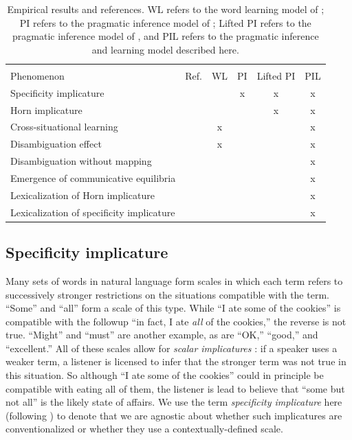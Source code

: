 \documentclass{article} %
\begin{document}
\begin{table}[t]
\label{tab:results}
\begin{center}
\begin{tabular}{lccccc}
\hline \\
Phenomenon & Ref. & WL & PI & Lifted PI  & PIL \\
\hline
Specificity implicature & \cite{grice1975} &  & x &x & x\\
Horn implicature & \cite{horn1984} & &  & x& x\\
Cross-situational learning & \cite{smith2008} & x& & & x \\
Disambiguation effect & \cite{markman1988} &x  & & & x \\
Disambiguation without mapping & \cite{horst2008} &  & & & x \\
Emergence of communicative equilibria & \cite{galantucci2005} & & & & x \\
Lexicalization of Horn implicature & \cite{horn1984} & & & & x \\
Lexicalization of specificity implicature & \cite{levinson2000} & & & & x \\
\hline
\end{tabular}
\end{center}
\caption{Empirical results and references. WL refers to the word learning model of \cite{frank2009}; PI refers to the pragmatic inference model of \cite{frank2012}; Lifted PI refers to the pragmatic inference model of \cite{bergen2012}, and PIL refers to the pragmatic inference and learning model described here.  }

\end{table}

\subsection{Specificity implicature}

Many sets of words in natural language form scales in which each term refers to successively stronger restrictions on the situations compatible with the term. ``Some'' and ``all'' form a scale of this type. While ``I ate some of the cookies'' is compatible with the followup ``in fact, I ate {\it all} of the cookies,'' the reverse is not true. ``Might'' and ``must'' are another example, as are ``OK,'' ``good,'' and ``excellent.'' All of these scales allow for {\it scalar implicatures} \cite{grice1975}: if a speaker uses a weaker term, a listener is licensed to infer that the stronger term was not true in this situation. So although ``I ate some of the cookies'' could in principle be compatible with eating all of them, the listener is lead to believe that ``some but not all'' is the likely state of affairs. We use the term {\it specificity implicature} here (following \cite{bergen2012}) to denote that we are agnostic about whether such implicatures are conventionalized or whether they use a contextually-defined scale.
\end{document}

